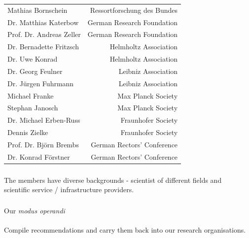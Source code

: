 \documentclass{beamer}
\begin{document}
\begin{frame}
  \frametitle{}
    \begin{block}{}  
      \begin{center}
        {\large
      \begin{tabular}{lr}
        Mathias Bornschein & Ressortforschung des Bundes\\
        Dr. Matthias Katerbow & German Research Foundation \\
        Prof. Dr. Andreas Zeller & German Research Foundation\\
        Dr. Bernadette Fritzsch & Helmholtz Association \\
        Dr. Uwe Konrad & Helmholtz Association\\
        Dr. Georg Feulner & Leibniz Association\\
        Dr. Jürgen Fuhrmann & Leibniz Association\\
        Michael Franke & Max Planck Society \\
        Stephan Janosch & Max Planck Society \\
        Dr. Michael Erben-Russ & Fraunhofer Society \\
        Dennis Zielke & Fraunhofer Society \\        
        Prof. Dr. Björn Brembs & German Rectors' Conference\\
        Dr. Konrad Förstner & German Rectors' Conference\\
      \end{tabular}}
    \end{center}
    \end{block}
\end{frame}

\begin{frame}
  \frametitle{}
  \begin{block}{}
    \begin{center}
      The members have diverse backgrounds - scientist of different
      fields and\\scientific service / infrastructure providers.
    \end{center}
  \end{block}
\end{frame}

\begin{frame}
  \frametitle{}
  \begin{block}{}
    \begin{center}
      Our \textit{modus operandi}\\\ \\
      Compile recommendations and carry them back into our research
      organisations.
    \end{center}
  \end{block}
\end{frame}
\end{document}
